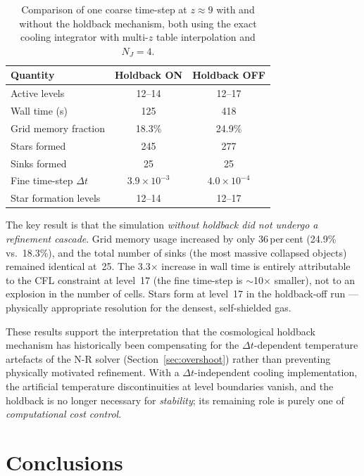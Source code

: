 \documentclass[fleqn,usenatbib]{mnras}
\begin{document}
\begin{table}
\centering
\caption{Comparison of one coarse time-step at $z \approx 9$ with
and without the holdback mechanism, both using the exact cooling
integrator with multi-$z$ table interpolation and $N_J = 4$.}
\label{tab:holdback_test}
\begin{tabular}{lcc}
\toprule
Quantity & Holdback ON & Holdback OFF \\
\midrule
Active levels              & 12--14  & 12--17 \\
Wall time (s)              & 125     & 418 \\
Grid memory fraction       & 18.3\%  & 24.9\% \\
Stars formed               & 245     & 277 \\
Sinks formed               & 25      & 25 \\
Fine time-step $\Delta t$  & $3.9 \times 10^{-3}$ & $4.0 \times 10^{-4}$ \\
Star formation levels      & 12--14  & 12--17 \\
\bottomrule
\end{tabular}
\end{table}

The key result is that the simulation \emph{without holdback did
not undergo a refinement cascade}.  Grid memory usage increased by
only 36\,per\,cent (24.9\% vs.\ 18.3\%), and the total number of
sinks (the most massive collapsed objects) remained identical at~25.
The 3.3$\times$ increase in wall time is entirely attributable to
the CFL constraint at level~17 (the fine time-step is
$\sim$10$\times$ smaller), not to an explosion in the number of
cells.  Stars form at level~17 in the holdback-off run ---
physically appropriate resolution for the densest, self-shielded
gas.

These results support the interpretation that the cosmological
holdback mechanism has historically been compensating for the
$\Delta t$-dependent temperature artefacts of the N-R solver
(Section~\ref{sec:overshoot}) rather than preventing physically
motivated refinement.  With a $\Delta t$-independent cooling
implementation, the artificial temperature discontinuities at level
boundaries vanish, and the holdback is no longer necessary for
\emph{stability}; its remaining role is purely one of
\emph{computational cost control}.


\section{Conclusions}
\label{sec:conclusions}
\end{document}
